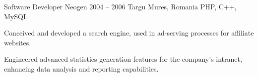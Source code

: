 \cvexperience
  {Software Developer}
  {Neogen}
  {2004 -- 2006}
  {Targu Mures, Romania}
  {PHP, C++, MySQL}
  {%
    \item Conceived and developed a search engine, used in ad-serving processes for affiliate websites.
    \item Engineered advanced statistics generation features for the company’s intranet, enhancing data analysis and reporting capabilities.
  }

